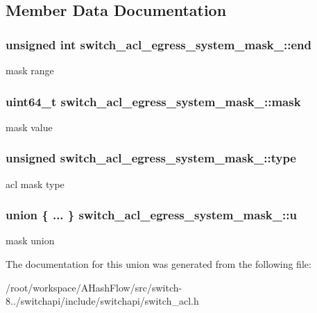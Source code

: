 \subsection{Member Data Documentation}
\hypertarget{unionswitch__acl__egress__system__mask___a9dbaa4ec39f12e0788ac16182db6217d}{
\subsubsection[{end}]{\setlength{\rightskip}{0pt plus 5cm}unsigned int switch\+\_\+acl\+\_\+egress\+\_\+system\+\_\+mask\+\_\+\+::end}}\label{unionswitch__acl__egress__system__mask___a9dbaa4ec39f12e0788ac16182db6217d}
mask range \hypertarget{unionswitch__acl__egress__system__mask___af6f50b3bde1f4efe78835e59de80b1ce}{
\subsubsection[{mask}]{\setlength{\rightskip}{0pt plus 5cm}uint64\+\_\+t switch\+\_\+acl\+\_\+egress\+\_\+system\+\_\+mask\+\_\+\+::mask}}\label{unionswitch__acl__egress__system__mask___af6f50b3bde1f4efe78835e59de80b1ce}
mask value \hypertarget{unionswitch__acl__egress__system__mask___a6446dc9bc18ec121ced34a9aaff974a0}{
\subsubsection[{type}]{\setlength{\rightskip}{0pt plus 5cm}unsigned switch\+\_\+acl\+\_\+egress\+\_\+system\+\_\+mask\+\_\+\+::type}}\label{unionswitch__acl__egress__system__mask___a6446dc9bc18ec121ced34a9aaff974a0}
acl mask type \hypertarget{unionswitch__acl__egress__system__mask___a697f37d371987947734860d7be3d7090}{
\subsubsection[{u}]{\setlength{\rightskip}{0pt plus 5cm}union \{ ... \}   switch\+\_\+acl\+\_\+egress\+\_\+system\+\_\+mask\+\_\+\+::u}}\label{unionswitch__acl__egress__system__mask___a697f37d371987947734860d7be3d7090}
mask union 

The documentation for this union was generated from the following file\+:\begin{DoxyCompactItemize}
\item 
/root/workspace/\+A\+Hash\+Flow/src/switch-\/8../switchapi/include/switchapi/switch\+\_\+acl.\+h\end{DoxyCompactItemize}
